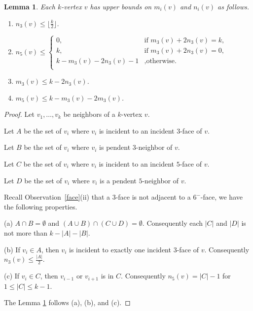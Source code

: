 \documentclass[11pt]{amsart} %
\newtheorem{lemma}[theorem]{Lemma}
\theoremstyle{definition}
\begin{document}
\begin{lemma}\label{number}
Each $k$-vertex $v$ has upper bounds on $m_i(v)$ and $n_i(v)$ 
as follows. 

	\begin{enumerate}
		\item [\rm (i)] $n_3(v)\leq\lfloor\frac{k}{2}\rfloor$. 
		
		\item [\rm (ii)]  
		$
		n_5(v) \leq
		\begin{cases}
		0,        & \text{if } m_3(v)+2n_3(v)= k,\\
		k,     & \text{if } m_3(v)+2n_3(v)=0,\\
		k-m_3(v)-2n_3(v)-1        & \text{,otherwise}.\\
		\end{cases}
		$
		
		
		\item [\rm (iii)]  $m_3(v)\leq k-2 n_3(v)$.
		
		\item [\rm (iv)] $m_5(v)\leq k-m_3(v)-2m_3(v)$.
	\end{enumerate}	
\end{lemma}	
\begin{proof} 
	Let $v_1, \ldots, v_k$ be neighbors of a $k$-vertex $v.$
	
	Let $A$ be the set of  $v_i$  where 
	$v_i$ is incident to an incident $3$-face of $v$. 
	
	Let $B$ be the set of  $v_i$ where 
	$v_i$ is pendent $3$-neighbor of $v$. 
	
	Let $C$ be the set of  $v_i$  where 
	$v_i$ is incident to an incident $5$-face of $v$. 
	
	Let $D$ be the set of  $v_i$  where 
	$v_i$ is a pendent $5$-neighbor of $v$.
	
	Recall Observation~\ref{face}(ii) that 
	a $3$-face is not adjacent to a $6^-$-face, 
	we have the following properties.
	
	(a) $A\cap B=\emptyset$ and  
	$(A\cup B)\cap (C\cup D)=\emptyset.$ 
	Consequently each $|C|$ and $|D|$  
	is not more than $k-|A|-|B|$. 
	
	(b) If $v_i\in A$, then $v_i$ is incident to exactly one incident $3$-face of $v$. 
	Consequently $n_3(v) \leq \frac{|A|}{2}.$ 
	
	(c) If $v_i\in C$, then  $v_{i-1}$ or $v_{i+1}$ is in $C$. 
	Consequently $n_5(v)= |C|-1$ for $1\leq |C| \leq k-1.$
	
	The Lemma \ref{number} follows (a), (b), and (c).
\end{proof}
\end{document}
